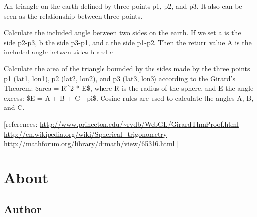 \documentclass[letterpaper,10pt,english]{sphinxmanual}
\begin{document}
\begin{fulllineitems}
\label{code:pyesg.Triangle}
An triangle on the earth defined by three points p1, p2, and p3.
It also can be seen as the relationship between three points.

\begin{fulllineitems}
\label{code:pyesg.Triangle.angles}
Calculate the included angle between two sides on the earth.
If we set a is the side p2-p3, b the side p3-p1, and c the side p1-p2.
Then the return value A is the included angle betwen sides b and c.

\end{fulllineitems}


\begin{fulllineitems}
\label{code:pyesg.Triangle.area}
Calculate the area of the triangle bounded by the sides made by the
three points p1 (lat1, lon1), p2 (lat2, lon2), and p3 (lat3, lon3) according to
the Girard's Theorem:
\$area = R\textasciicircum{}2 * E\$,
where R is the radius of the sphere, and E the angle excess:
\$E = A + B + C - pi\$.
Cosine rules are used to calculate the angles A, B, and C.

{[}references:
\href{http://www.princeton.edu/~rvdb/WebGL/GirardThmProof.html}{http://www.princeton.edu/\textasciitilde{}rvdb/WebGL/GirardThmProof.html}
\href{http://en.wikipedia.org/wiki/Spherical\_trigonometry}{http://en.wikipedia.org/wiki/Spherical\_trigonometry}
\href{http://mathforum.org/library/drmath/view/65316.html}{http://mathforum.org/library/drmath/view/65316.html}
{]}

\end{fulllineitems}


\end{fulllineitems}



\chapter{About}
\label{about:about}\label{about::doc}

\section{Author}
\label{about:author}
\end{document}
